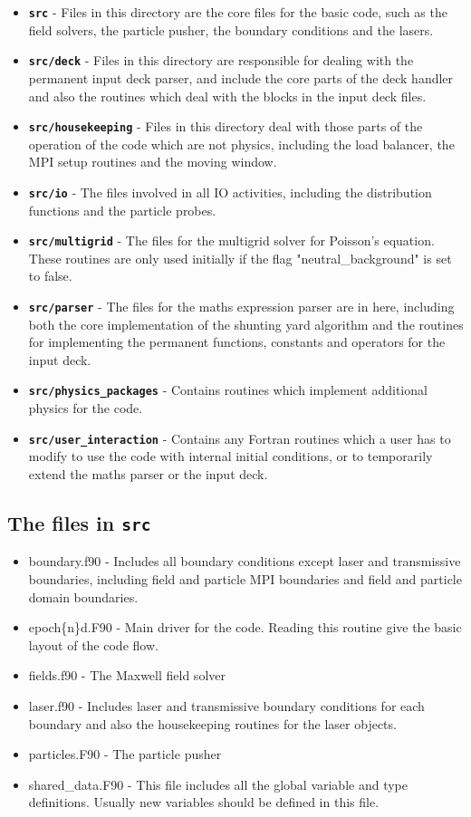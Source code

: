 \documentclass[12pt,a4paper]{article}
\newcommand{\inlinecode}[1]{{\color{warwickred} \bf\texttt{#1}}}
\newcommand{\EPOCH}{{\color{warwickdark}\fontfamily{phv}\selectfont{EPOCH}}}
\begin{document}
\begin{itemize}
\item \inlinecode{src} - Files in this directory are the core files for the
  basic {\EPOCH} code, such as the field solvers, the particle pusher, the
  boundary conditions and the lasers.
\item \inlinecode{src/deck} - Files in this directory are responsible for
  dealing with the permanent input deck parser, and include the core parts of
  the deck handler and also the routines which deal with the blocks in the
  input deck files.
\item \inlinecode{src/housekeeping} - Files in this directory deal with those
  parts of the operation of the code which are not physics, including the load
  balancer, the MPI setup routines and the moving window.
\item \inlinecode{src/io} - The files involved in all IO activities, including
  the distribution functions and the particle probes.
\item \inlinecode{src/multigrid} - The files for the multigrid solver for
  Poisson's equation. These routines are only used initially if the flag
  "neutral\_background" is set to false.
\item \inlinecode{src/parser} - The files for the maths expression parser are
  in here, including both the core implementation of the shunting yard
  algorithm and the routines for implementing the permanent functions,
  constants and operators for the input deck.
\item \inlinecode{src/physics\_packages} - Contains routines which implement
  additional physics for the code.
\item \inlinecode{src/user\_interaction} - Contains any Fortran routines which
  a user has to modify to use the code with internal initial conditions, or to
  temporarily extend the maths parser or the input deck.
\end{itemize}

\subsection{The files in \inlinecode{src}}
\begin{itemize}
\item boundary.f90 - Includes all boundary conditions except laser and
  transmissive boundaries, including field and particle MPI boundaries and
  field and particle domain boundaries.
\item epoch\{n\}d.F90 - Main driver for the code. Reading this routine give
  the basic layout of the code flow.
\item fields.f90 - The Maxwell field solver
\item laser.f90 - Includes laser and transmissive boundary conditions for each
  boundary and also the housekeeping routines for the laser objects.
\item particles.F90 - The particle pusher
\item shared\_data.F90 - This file includes all the global variable and type
  definitions. Usually new variables should be defined in this file.
\end{itemize}
\end{document}
